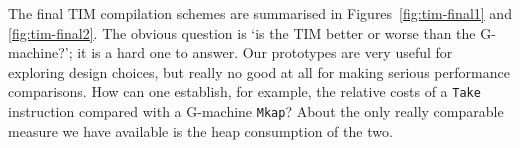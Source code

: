 The final TIM compilation schemes are summarised in
Figures~\ref{fig:tim-final1} and \ref{fig:tim-final2}.
The obvious question is `is the TIM better or worse than the G-machine?';
it is a hard one to answer.  Our prototypes are very useful for exploring
design choices, but really no good at all for making serious performance
comparisons.  How can one establish, for example, the relative costs of
a \mbox{\tt Take} instruction compared with a G-machine \mbox{\tt Mkap}?
About the only really comparable measure we have available is the heap
consumption of the two.
